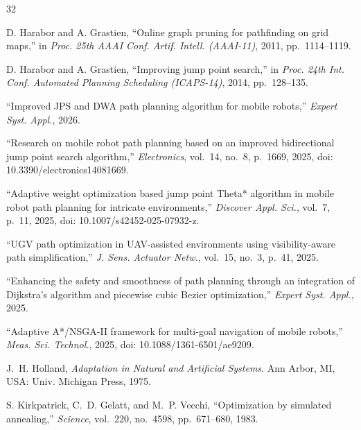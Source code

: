 \documentclass[lettersize,journal]{IEEEtran}
\begin{document}
\begin{thebibliography}{32}

D. Harabor and A. Grastien, ``Online graph pruning for pathfinding on grid maps,'' in \textit{Proc. 25th AAAI Conf. Artif. Intell. (AAAI-11)}, 2011, pp.~1114--1119.


D. Harabor and A. Grastien, ``Improving jump point search,'' in \textit{Proc. 24th Int. Conf. Automated Planning Scheduling (ICAPS-14)}, 2014, pp.~128--135.


``Improved JPS and DWA path planning algorithm for mobile robots,'' \textit{Expert Syst. Appl.}, 2026.


``Research on mobile robot path planning based on an improved bidirectional jump point search algorithm,'' \textit{Electronics}, vol.~14, no.~8, p.~1669, 2025, doi: 10.3390/electronics14081669.


``Adaptive weight optimization based jump point Theta* algorithm in mobile robot path planning for intricate environments,'' \textit{Discover Appl. Sci.}, vol.~7, p.~11, 2025, doi: 10.1007/s42452-025-07932-z.


``UGV path optimization in UAV-assisted environments using visibility-aware path simplification,'' \textit{J. Sens. Actuator Netw.}, vol.~15, no.~3, p.~41, 2025.


``Enhancing the safety and smoothness of path planning through an integration of Dijkstra's algorithm and piecewise cubic Bezier optimization,'' \textit{Expert Syst. Appl.}, 2025.


``Adaptive A*/NSGA-II framework for multi-goal navigation of mobile robots,'' \textit{Meas. Sci. Technol.}, 2025, doi: 10.1088/1361-6501/ae9209.


J.~H. Holland, \textit{Adaptation in Natural and Artificial Systems}. Ann Arbor, MI, USA: Univ. Michigan Press, 1975.


S. Kirkpatrick, C.~D. Gelatt, and M.~P. Vecchi, ``Optimization by simulated annealing,'' \textit{Science}, vol.~220, no.~4598, pp.~671--680, 1983.



\end{thebibliography}
\end{document}
